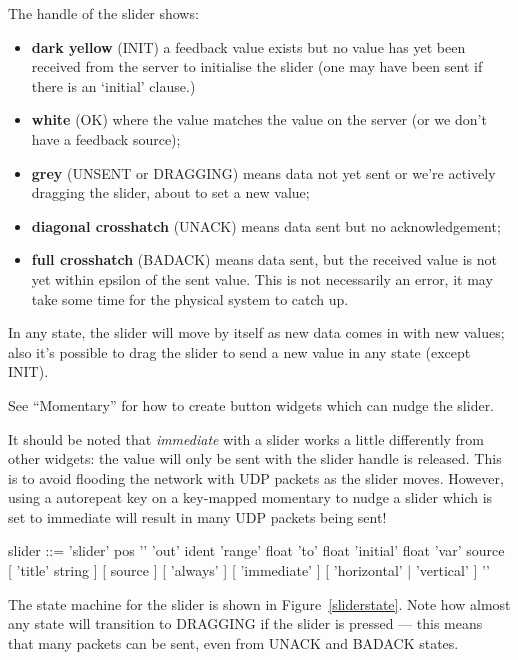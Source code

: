 The handle of the slider shows:
\begin{itemize}
\item \textbf{dark yellow} (INIT) a feedback value exists but no value has yet been received
from the server to initialise the slider (one may have been sent if there is an `initial'
clause.)
\item \textbf{white} (OK) where the value matches the value on the server (or we
don't have a feedback source);
\item \textbf{grey} (UNSENT or DRAGGING) means data not yet sent or we're actively
dragging the slider, about to set a new value;
\item \textbf{diagonal crosshatch} (UNACK) means data sent but no acknowledgement;
\item \textbf{full crosshatch} (BADACK) means data sent, but the received value is not
yet within epsilon of the sent value. This is not necessarily an error,
it may take some time for the physical system to catch up.
\end{itemize}
In any state, the slider will move by itself as new data comes in with new values; also it's possible
to drag the slider to send a new value in any state (except INIT).

See ``Momentary'' for how to create button widgets which can nudge the slider.

It should be noted that \emph{immediate} with a slider works a little
differently from other widgets: the value will only be sent with the slider
handle is released. This is to avoid flooding the network with UDP packets as
the slider moves. However, using a autorepeat key on a key-mapped momentary
to nudge a slider which is set to immediate will result in many UDP packets
being sent!

\begin{v}
slider      ::= 'slider' pos '{'
                    'out' ident
                    'range' float 'to' float
                    'initial' float
                    'var' source
                    [ 'title' string ]
                    [ source ]
                    [ 'always' ]
                    [ 'immediate' ]
                    [ 'horizontal' | 'vertical' ]
                '}'
\end{v}
The state machine for the slider is shown in Figure~\ref{sliderstate}. Note how
almost any state will transition to DRAGGING if the slider is pressed --- this means
that many packets can be sent, even from UNACK and BADACK states.

